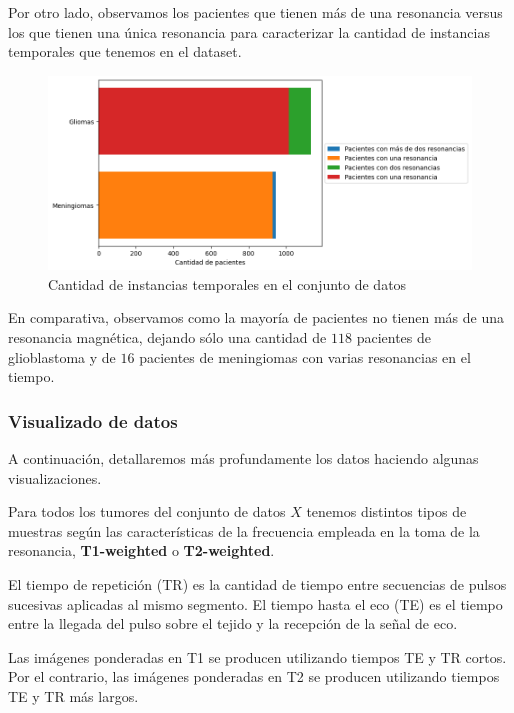 Por otro lado, observamos los pacientes que tienen más de una resonancia versus los que tienen una única resonancia para caracterizar la cantidad de instancias temporales que tenemos en el dataset.
\\


\begin{figure}[!h]
	\centering
	\includegraphics[width=1.0\linewidth]{imagenes/cantidadinstanciastemporales.png}
	\caption{Cantidad de instancias temporales en el conjunto de datos}
\end{figure}

En comparativa, observamos como la mayoría de pacientes no tienen más de una resonancia magnética, dejando sólo una cantidad de $118$ pacientes de glioblastoma y de $16$ pacientes de meningiomas con varias resonancias en el tiempo.

\subsubsection{Visualizado de datos}

A continuación, detallaremos más profundamente los datos haciendo algunas visualizaciones. 

Para todos los tumores del conjunto de datos $X$ tenemos distintos tipos de muestras según las características de la frecuencia empleada en la toma de la resonancia, \textbf{T1-weighted} o \textbf{T2-weighted}. \cite{labella2023asnrmiccai}

El tiempo de repetición (TR) es la cantidad de tiempo entre secuencias de pulsos sucesivas aplicadas al mismo segmento. El tiempo hasta el eco (TE) es el tiempo entre la llegada del pulso sobre el tejido y la recepción de la señal de eco.

Las imágenes ponderadas en T1 se producen utilizando tiempos TE y TR cortos. Por el contrario, las imágenes ponderadas en T2 se producen utilizando tiempos TE y TR más largos.

